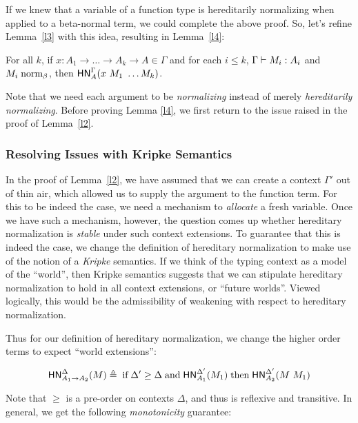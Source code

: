 \documentclass{article}
\begin{document}
If we knew that a variable of a function type is hereditarily normalizing when applied to a
beta-normal term, we could complete the above proof.  So, let's refine Lemma~\ref{l3} with
this idea, resulting in Lemma~\ref{l4}:

\begin{lemma}\label{l4}
For all $k$, if $x : A_1 \to \dots \to A_k \to A \in \Gamma$ and for each $i \le k$, $\Gamma \vdash M_i : A_i$ and $M_i \mathrel{\text{norm}_\beta}$, then $\mathsf{HN}^{\Gamma}_{A}(x\ M_1\ \dots M_k)$.
\end{lemma}

Note that we need each argument to be \emph{normalizing} instead of merely \emph{hereditarily
  normalizing}.  Before proving Lemma \ref{l4}, we first return to the issue raised in the
proof of Lemma~\ref{l2}.

\subsubsection{Resolving Issues with Kripke Semantics}\label{sec:kripke_sem}

In the proof of Lemma~\ref{l2}, we have assumed that we can create a context $\Gamma'$ out of
thin air, which allowed us to supply the argument to the function term.  For this to be indeed
the case, we need a mechanism to \emph{allocate} a fresh variable.  Once we have such a
mechanism, however, the question comes up whether hereditary normalization is \emph{stable}
under such context extensions.  To guarantee that this is indeed the case, we change the
definition of hereditary normalization to make use of the notion of a \emph{Kripke} semantics.
If we think of the typing context as a model of the ``world'', then Kripke semantics suggests
that we can stipulate hereditary normalization to hold in all context extensions, or ``future
worlds''. Viewed logically, this would be the admissibility of weakening with respect to
hereditary normalization.

Thus for our definition of hereditary normalization, we change the higher order terms to expect
``world extensions'':

\[
\mathsf{HN}^{\Delta}_{A_1 \to A_2}(M) \triangleq \;\text{if}\; \Delta' \ge \Delta \;\text{and}\; \mathsf{HN}^{\Delta'}_{A_1}(M_1)
\;\text{then}\; \mathsf{HN}^{\Delta'}_{A_2}(M\ M_1)
\]

Note that $\ge$ is a pre-order on contexts $\Delta$, and thus is reflexive and transitive.  In
general, we get the following \emph{monotonicity} guarantee:
\end{document}
